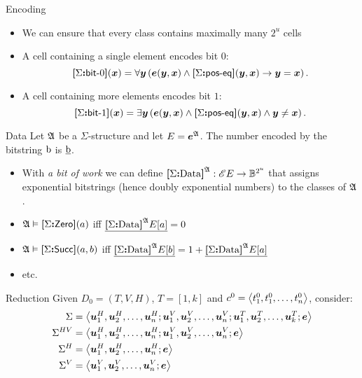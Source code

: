 \documentclass{beamer}
\begin{document}
\begin{frame}{Encoding}
\begin{itemize}
  \item We can ensure that every class contains maximally many $2^u$ cells
  \item A cell containing a single element encodes bit $0$:
  \[
    {\bm{[}\Sigma\mathord{\bm{:}}\mathsf{bit}{\hbox{-}}0\bm{]}}(\bm{x}) = \forall\bm{y} \left(
    \bm{e}(\bm{y},\bm{x}) \land {\bm{[}\Sigma\mathord{\bm{:}}\mathsf{pos}{\hbox{-}}\mathsf{eq}\bm{]}}(\bm{y},\bm{x}) \rightarrow \bm{y} = \bm{x}\right).
  \] 
  \item A cell containing more elements encodes bit $1$:
  \[
    {\bm{[}\Sigma\mathord{\bm{:}}\mathsf{bit}{\hbox{-}}1\bm{]}}(\bm{x}) = \exists\bm{y} \left(
    \bm{e}(\bm{y},\bm{x}) \land {\bm{[}\Sigma\mathord{\bm{:}}\mathsf{pos}{\hbox{-}}\mathsf{eq}\bm{]}}(\bm{y},\bm{x}) \land \bm{y} \neq \bm{x}\right).
  \]
\end{itemize}
\end{frame}

\begin{frame}{Data}
Let $\mathfrak{A}$ be a $\Sigma$-structure and let $E = \bm{e}^{\mathfrak{A}}$.
The number encoded by the bitstring $\mathrm{b}$ is $\underline{\mathrm{b}}$.
  
\begin{itemize}
  \item With \emph{a bit of work} we can define
  ${\bm{[}\Sigma\mathord{\bm{:}}\mathrm{Data}\bm{]}}^{\mathfrak{A}} : {\mathscr{E}E} \to \mathbb{B}^{2^u}$ that assigns
  exponential bitstrings (hence doubly exponential numbers) to the classes of
  $\mathfrak{A}$.
  \item $\mathfrak{A}\vDash{\bm{[}\Sigma\mathord{\bm{:}}\mathsf{Zero}\bm{]}}(a)$ iff
  $\underline{{\bm{[}\Sigma\mathord{\bm{:}}\mathrm{Data}\bm{]}}^{\mathfrak{A}}{E[a]}} = 0$
  \item $\mathfrak{A}\vDash{\bm{[}\Sigma\mathord{\bm{:}}\mathsf{Succ}\bm{]}}(a,b)$ iff
  $\underline{{\bm{[}\Sigma\mathord{\bm{:}}\mathrm{Data}\bm{]}}^{\mathfrak{A}}{E[b]}} = 1 +
  \underline{{\bm{[}\Sigma\mathord{\bm{:}}\mathrm{Data}\bm{]}}^{\mathfrak{A}}{E[a]}}$
  \item etc.
\end{itemize}
\end{frame}

\begin{frame}{Reduction}
Given $D_0 = (T,V,H)$, $T = [1,k]$ and $c^0 = \left\langle t_1^0,t_1^0,\dots,t_n^0 \right\rangle$,
consider:
\begin{align*}
\Sigma &=
\left\langle \bm{u}_{1}^H,\bm{u}_{2}^H,\dots,\bm{u}_{n}^H;\bm{u}_{1}^V,\bm{u}_{2}^V,\dots,\bm{u}_{n}^V;
\bm{u}_{1}^T,\bm{u}_{2}^T,\dots,\bm{u}_{k}^T;\bm{e} \right\rangle \\
\Sigma^{HV} &=
\left\langle \bm{u}_{1}^H,\bm{u}_{2}^H,\dots,\bm{u}_{n}^H;\bm{u}_{1}^V,\bm{u}_{2}^V,\dots,\bm{u}_{n}^V;\bm{e} \right\rangle \\
\Sigma^{H} &=
\left\langle \bm{u}_{1}^H,\bm{u}_{2}^H,\dots,\bm{u}_{n}^H;\bm{e} \right\rangle \\
\Sigma^{V} &=
\left\langle \bm{u}_{1}^V,\bm{u}_{2}^V,\dots,\bm{u}_{n}^V;\bm{e} \right\rangle
\end{align*}
\end{frame}
\end{document}
